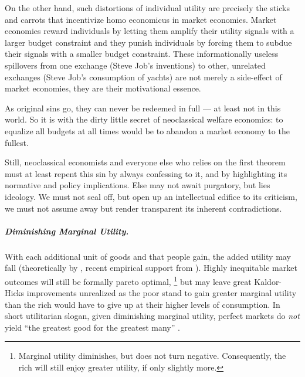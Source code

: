 On the other hand, such distortions of individual utility are precisely the sticks and carrots that incentivize homo economicus in market economies.
Market economies reward individuals by letting them amplify their utility signals with a larger budget constraint and they punish individuals by forcing them to subdue their signals with a smaller budget constraint.
These informationally useless spillovers from one exchange (Steve Job's inventions) to other, unrelated exchanges (Steve Job's consumption of yachts) are not merely a side-effect of market economies, they are their motivational essence.

As original sins go, they can never be redeemed in full --- at least not in this world.
So it is with the dirty little secret of neoclassical welfare economics:
to equalize all budgets at all times would be to abandon a market economy to the fullest.

Still, neoclassical economists and everyone else who relies on the first theorem must at least repent this sin by always confessing to it, and by highlighting its normative and policy implications.
Else may not await purgatory, but lies ideology.
We must not seal off, but open up an intellectual edifice to its criticism, we must not assume away but render transparent its inherent contradictions.

\subparagraph{Diminishing Marginal Utility.}
	\label{sec:diminishing-marginal-utility}
With each additional unit of goods and that people gain, the added utility may fall (theoretically by \citealt[23]{Lerner1944}, recent empirical support from \citealt{Ng-1997-aa,Veenhoven-2000-aa,Nickell2008}).
Highly inequitable market outcomes will still be formally pareto optimal,
\footnote{
	Marginal utility diminishes, but does not turn negative.
	Consequently, the rich will still enjoy greater utility, if only slightly more.
}
but may leave great Kaldor-Hicks improvements unrealized as the poor stand to gain greater marginal utility than the rich would have to give up at their higher levels of consumption.
In short utilitarian slogan, given diminishing marginal utility, perfect markets do \emph{not} yield ``the greatest good for the greatest many'' \citep{Mill1863}.

